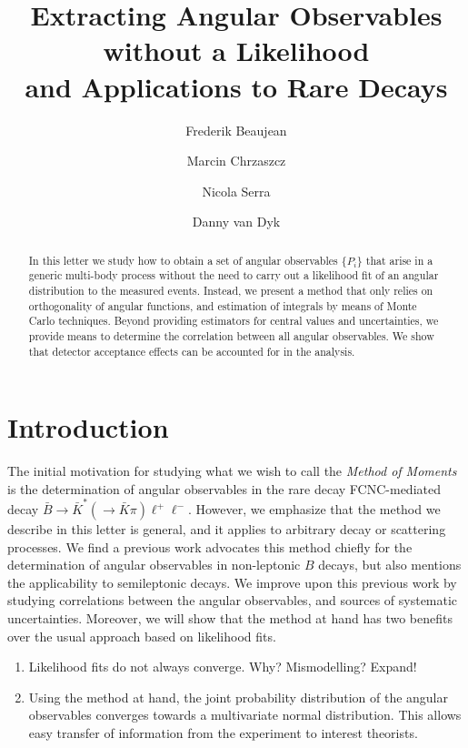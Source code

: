 \documentclass[aps,prd,reprint,nofootinbib,preprintnumbers]{revtex4}
\newcommand{\fred}[1]{{\color{brown!85!black}#1}}
\begin{document}
\allowdisplaybreaks

\title{Extracting Angular Observables without a Likelihood\\and Applications to Rare Decays}
\author{Frederik Beaujean}
\author{Marcin Chrzaszcz}
\author{Nicola Serra}
\author{Danny van Dyk}

\begin{abstract}
In this letter we study how to obtain a set of angular observables
$\{P_i\}$ that arise in a generic multi-body process without the need
to carry out a likelihood fit of an angular distribution to the
measured events. Instead, we present a method that only relies on
orthogonality of angular functions, and estimation of integrals
by means of Monte Carlo techniques. Beyond providing estimators
for central values and uncertainties, we provide means to determine
the correlation between all angular observables. We show that detector
acceptance effects can be accounted for in the analysis.
\end{abstract}

\maketitle

\section{Introduction}
\label{sec:intro}

The initial motivation for studying what we wish to call the \emph{Method of Moments}
is the determination of angular observables in the rare decay FCNC-mediated decay
$\bar{B}\to \bar{K}^*(\to \bar{K}\pi)\ell^+\ell^-$. However, we emphasize that
the method we describe in this letter is general, and it applies to arbitrary
decay or scattering processes. We find a previous work \cite{Dighe:1998vk}
advocates this method chiefly for the determination of angular observables in non-leptonic
$B$ decays, but also mentions the applicability to semileptonic decays. We improve
upon this previous work by studying correlations between the angular observables,
and sources of systematic uncertainties. Moreover, we will show that the method
at hand has two benefits over the usual approach based on likelihood fits.
\begin{enumerate}
    \item Likelihood fits do not always converge. \fred{Why? Mismodelling? Expand!}
    \item Using the method at hand, the joint probability distribution of the
        angular observables converges towards a multivariate normal distribution.
        This allows easy transfer of information from the experiment to interest
        theorists.
\end{enumerate}
\end{document}
